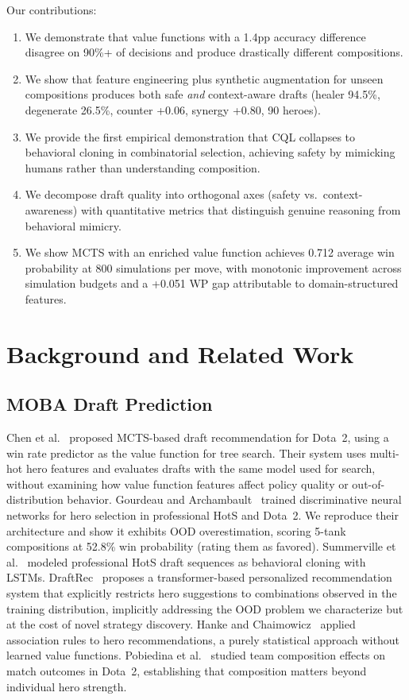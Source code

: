 \documentclass[journal]{IEEEtran}
\begin{document}
Our contributions:
\begin{enumerate}
    \item We demonstrate that value functions with a 1.4pp accuracy difference disagree on 90\%+ of decisions and produce drastically different compositions.
    \item We show that feature engineering plus synthetic augmentation for unseen compositions produces both safe \textit{and} context-aware drafts (healer 94.5\%, degenerate 26.5\%, counter +0.06, synergy +0.80, 90 heroes).
    \item We provide the first empirical demonstration that CQL collapses to behavioral cloning in combinatorial selection, achieving safety by mimicking humans rather than understanding composition.
    \item We decompose draft quality into orthogonal axes (safety vs.\ context-awareness) with quantitative metrics that distinguish genuine reasoning from behavioral mimicry.
    \item We show MCTS with an enriched value function achieves 0.712 average win probability at 800 simulations per move, with monotonic improvement across simulation budgets and a +0.051 WP gap attributable to domain-structured features.
\end{enumerate}

\section{Background and Related Work}

\subsection{MOBA Draft Prediction}

Chen et al.~\cite{chen2018drafting} proposed MCTS-based draft recommendation for Dota~2, using a win rate predictor as the value function for tree search. Their system uses multi-hot hero features and evaluates drafts with the same model used for search, without examining how value function features affect policy quality or out-of-distribution behavior. Gourdeau and Archambault~\cite{gourdeau2021discriminative} trained discriminative neural networks for hero selection in professional HotS and Dota~2. We reproduce their architecture and show it exhibits OOD overestimation, scoring 5-tank compositions at 52.8\% win probability (rating them as favored). Summerville et al.~\cite{summerville2016draft} modeled professional HotS draft sequences as behavioral cloning with LSTMs. DraftRec~\cite{lee2022draftrec} proposes a transformer-based personalized recommendation system that explicitly restricts hero suggestions to combinations observed in the training distribution, implicitly addressing the OOD problem we characterize but at the cost of novel strategy discovery. Hanke and Chaimowicz~\cite{hanke2017recommending} applied association rules to hero recommendations, a purely statistical approach without learned value functions. Pobiedina et al.~\cite{pobiedina2013draft} studied team composition effects on match outcomes in Dota~2, establishing that composition matters beyond individual hero strength.
\end{document}

